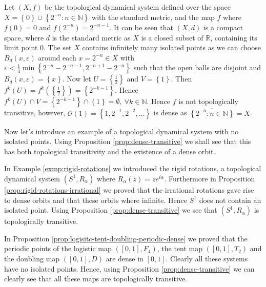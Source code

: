 \begin{exmp} \label{exmp:dense-orbit-not-equal-transitive}
    Let $(X, f)$ be the topological dynamical system defined over the space $X = \left\lbrace 0 \right\rbrace \cup \left\lbrace 2^{-n} : n \in \mathbb{N} \right\rbrace$ with the standard metric, and the map $f$ where $f(0) = 0$ and $f(2^{-n}) = 2^{-n-1}$. It can be seen that $(X, d)$ is a compact space, where $d$ is the standard metric as $X$ is a closed subset of $\mathbb{R}$, containing its limit point $0$. The set $X$ contains infinitely many isolated points as we can choose $B_d(x, \varepsilon)$ around each $x = 2^{-n} \in X$ with $\varepsilon < \frac{1}{4} \min\left\lbrace 2^{-n} - 2^{-n-1}, 2^{-n + 1} - 2^{-n} \right\rbrace$ such that the open balls are disjoint and $B_d(x, \varepsilon) = \left\lbrace x \right\rbrace$. Now let $U = \left\lbrace \frac{1}{2} \right\rbrace$ and $V = \left\lbrace 1 \right\rbrace$. Then $f^k(U) = f^k(\left\lbrace \frac{1}{2} \right\rbrace) = \left\lbrace 2^{-k-1} \right\rbrace$. Hence $f^k(U) \cap V = \left\lbrace 2^{-k-1} \right\rbrace \cap \left\lbrace 1 \right\rbrace = \emptyset, \ \forall k \in \mathbb{N}$. Hence $f$ is not topologically transitive, however, $\mathcal{O}(1) = \left\lbrace 1, 2^{-1}, 2^{-2}, \dots \right\rbrace$ is dense as $\overline{\left\lbrace2^{-n}: n \in \mathbb{N}\right\rbrace} = X$.
\end{exmp}

Now let's introduce an example of a topological dynamical system with no isolated points. Using Proposition \ref{prop:dense-transitive} we shall see that this has both topological transitivity and the existence of a dense orbit.

\begin{exmp} \label{exmp:dense-orbit-and-transitive}
    In Example \ref{exmp:rigid-rotations} we introduced the rigid rotations, a topological dynamical system $(S^1, R_\alpha)$ where $R_{\alpha}(z) = ze^{i\alpha}$. Furthermore in Proposition \ref{prop:rigid-rotations-irrational} we proved that the irrational rotations gave rise to dense orbits and that these orbits where infinite. Hence $S^1$ does not contain an isolated point. Using Proposition \ref{prop:dense-transitive} we see that $(S^1, R_\alpha)$ is topologically transitive.
\end{exmp}

\begin{exmp} \label{exmp:logistic-tent-doubling-transitive}
    In Proposition \ref{prop:logisitc-tent-doubling-periodic-dense} we proved that the periodic points of the logistic map $([0, 1], F_4)$, the tent map $([0, 1], T_2)$ and the doubling map $([0, 1], D)$ are dense in $[0, 1]$. Clearly all these systems have no isolated points. Hence, using Proposition \ref{prop:dense-transitive} we can clearly see that all these maps are topologically transitive.
\end{exmp}

